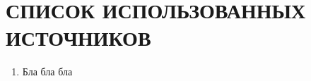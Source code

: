 \section*{СПИСОК ИСПОЛЬЗОВАННЫХ ИСТОЧНИКОВ}

\begin{enumerate}[wide]
    \item Бла бла бла
\end{enumerate}